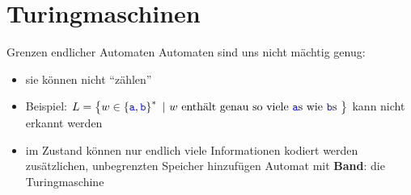 \graphicspath{{../figures/}}

\newenvironment{Messtabelle}[1]
{\begin{minipage}{\linewidth} \centering  \begin{tabular}{#1} }
{\end{tabular} \vspace*{1em} \end{minipage}} 

\section{Turingmaschinen}

\begin{frame}{Grenzen endlicher Automaten}
	Automaten sind uns nicht mächtig genug:
	\begin{itemize}[<+->]
		\item sie können nicht ``zählen''
		\item Beispiel: $L=\left\{ w \in \left\{ \hbox{\textcolor{blue}{\texttt{a}}}, \hbox{\textcolor{blue}{\texttt{b}}} \right\}^* \text{ | } w \text{ enthält genau so viele \hbox{\textcolor{blue}{\texttt{a}}}s wie \hbox{\textcolor{blue}{\texttt{b}}}s } \right\}$ kann nicht erkannt werden
		\item im Zustand können nur endlich viele Informationen kodiert werden
		\implitem zusätzlichen, unbegrenzten Speicher hinzufügen
		\implitem Automat mit \textbf{Band}: die Turingmaschine
	\end{itemize}
\end{frame}

